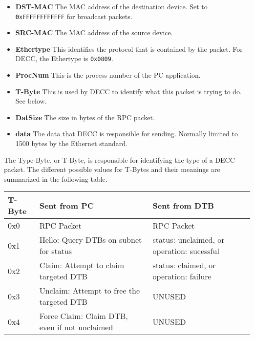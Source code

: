 \documentclass{article}
\begin{document}
\begin{itemize}
  \item \textbf{DST-MAC} The MAC address of the destination device. Set to
  \verb!0xFFFFFFFFFFFF! for broadcast packets.
  \item \textbf{SRC-MAC} The MAC address of the source device. 
  \item \textbf{Ethertype} This identifies the protocol that is contained by the
  packet. For DECC, the Ethertype is \verb!0x0809!.
  \item \textbf{ProcNum} This is the process number of the PC application. 
  \item \textbf{T-Byte} This is used by DECC to identify what this packet is
  trying to do. See below.
  \item \textbf{DatSize} The size in bytes of the RPC packet.
  \item \textbf{data} The data that DECC is responsible for sending. Normally
  limited to 1500 bytes by the Ethernet standard.
\end{itemize}

The Type-Byte, or T-Byte, is responsible for identifying the type of a DECC packet. The different possible values for T-Bytes and their meanings are summarized in the following table.

\begin{table}[h]
\centering
\begin{tabular}{|l|l|l|} \hline
T-Byte  & Sent from PC     & Sent from DTB \\ \hline 
0x0 & RPC Packet           & RPC Packet \\ \hline
0x1 & Hello: Query DTBs on subnet for status        & status: unclaimed, or
operation: sucessful \\ \hline
0x2 & Claim: Attempt to claim targeted DTB          & status: claimed, or
operation: failure   \\ \hline
0x3 & Unclaim: Attempt to free the targeted DTB     & UNUSED\\ \hline
0x4 & Force Claim: Claim DTB, even if not unclaimed & UNUSED \\ \hline
\end{tabular}
\end{table}
\end{document}

